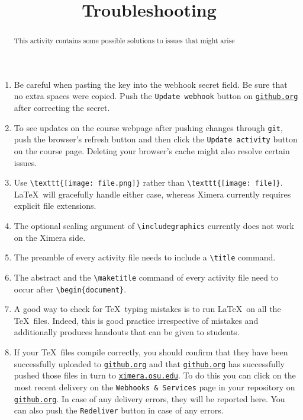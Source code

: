 \documentclass{ximera}
\title{Troubleshooting}
\begin{document}
\begin{abstract}
This activity contains some possible solutions
to issues that might arise
\end{abstract}
\maketitle
\begin{enumerate}
\item Be careful when pasting the key into
the webhook secret field. Be sure that no extra
spaces were copied. Push the \verb!Update webhook! button on
\href{http://github.org}{\tt github.org}
after correcting the secret.

\item To see updates on the course webpage
after pushing changes through \verb!git!,
push the browser's refresh button
and then click the \verb!Update activity! button 
on the course page. Deleting your browser's cache
might also resolve certain issues.

\item Use \verb!\texttt{[image: file.png]}! rather than
\verb!\texttt{[image: file]}!. \LaTeX\ will gracefully handle either
case, whereas Ximera currently requires explicit file extensions.

\item The optional scaling argument of \verb!\includegraphics!
currently does not work on the Ximera side.

\item The preamble of every activity file needs to 
include a \verb!\title! command. 

\item The abstract 
and the \verb!\maketitle! command
of every activity file
need to occur after \verb!\begin{document}!.

\item A good way to check for \TeX\ typing mistakes
is to run \LaTeX\ on all the \TeX\ files. Indeed, this
is good practice irrespective of mistakes
and additionally produces handouts that
can be given to students.

\item If your \TeX\ files compile correctly,
you should confirm that they have been successfully uploaded to
\href{http://github.org}{\tt github.org} and that 
\href{http://github.org}{\tt github.org} has successfully
pushed those files in turn to
\href{http://ximera.osu.edu}{\tt ximera.osu.edu}.
To do this you can click on the most recent delivery
on the \verb!Webhooks & Services! page in your repository on
\href{http://github.org}{\tt github.org}.
In case of any delivery errors, they will be reported here.
You can also push the \verb!Redeliver! button
in case of any errors.

\end{enumerate}
\end{document}
